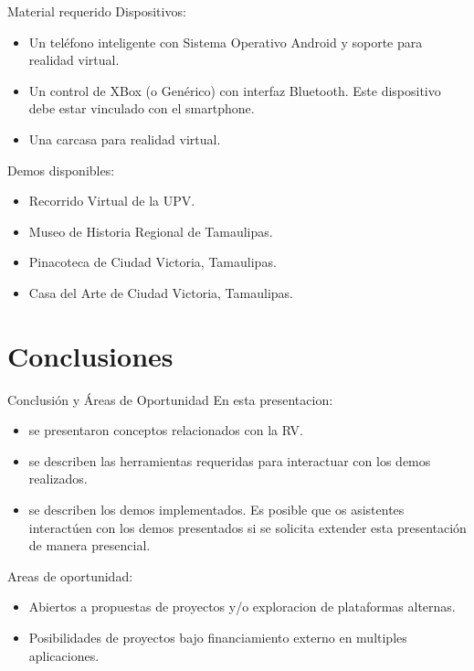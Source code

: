 \documentclass[aspectratio=169,compress]{beamer}
\begin{document}
\begin{frame}{Material requerido}
Dispositivos:
\begin{itemize}
\item Un teléfono inteligente con Sistema Operativo Android y soporte para realidad virtual.
\item Un control de XBox (o Genérico) con interfaz Bluetooth\tm. Este dispositivo debe estar vinculado con el smartphone. 
\item Una carcasa para realidad virtual. 

\end{itemize}

Demos disponibles:
\begin{itemize}
\item Recorrido Virtual de la UPV.
\item Museo de Historia Regional de Tamaulipas.
\item Pinacoteca de Ciudad Victoria, Tamaulipas.
\item Casa del Arte de Ciudad Victoria, Tamaulipas.
\end{itemize}
\end{frame}








\section[CP1]{Conclusiones }
\begin{frame}{Conclusi\'on y Áreas de Oportunidad}
En esta presentacion:
\begin{itemize}
\item se presentaron conceptos relacionados con la RV. 
\item se describen las herramientas requeridas para interactuar con los demos realizados. 
\item se describen los demos implementados. Es posible que os asistentes interactúen con los demos presentados si se solicita extender esta presentación de manera presencial.
\end{itemize}
Areas de oportunidad:
\begin{itemize}
\item Abiertos a propuestas de proyectos y/o exploracion de plataformas alternas.
\item Posibilidades de proyectos bajo financiamiento externo en multiples aplicaciones.
\end{itemize}

\end{frame}
\end{document}
